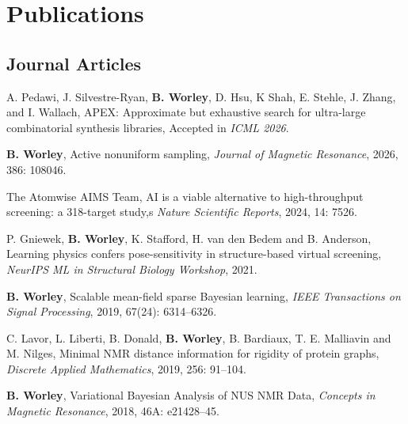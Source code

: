 \documentclass[letterpaper]{article}
\renewenvironment{itemize}{
  \begin{list}{}{
    \setlength{\leftmargin}{1.5em}
  }
}{
  \end{list}
}
\begin{document}
\section*{Publications}

\subsection*{Journal Articles}


\begin{itemize}

 \item A. Pedawi, J. Silvestre-Ryan, \textbf{B. Worley}, D. Hsu,
  K Shah, E. Stehle, J. Zhang, and I. Wallach,
  APEX: Approximate but exhaustive search for ultra-large
  combinatorial synthesis libraries,
  Accepted in \emph{ICML 2026}.

 \item \textbf{B. Worley},
  Active nonuniform sampling,
  \emph{Journal of Magnetic Resonance},
  2026, 386: 108046.

 \item The Atomwise AIMS Team, AI is a viable alternative to
  high-throughput screening: a 318-target study,s
  \emph{Nature Scientific Reports}, 2024, 14: 7526.

 \item P. Gniewek, \textbf{B. Worley}, K. Stafford, H. van den Bedem
  and B. Anderson, Learning physics confers pose-sensitivity in
  structure-based virtual screening,
  \emph{NeurIPS ML in Structural Biology Workshop}, 2021.

 \item \textbf{B. Worley},
  Scalable mean-field sparse Bayesian learning,
  \emph{IEEE Transactions on Signal Processing},
  2019, 67(24): 6314--6326.

 \item C. Lavor, L. Liberti, B. Donald, \textbf{B. Worley},
  B. Bardiaux, T. E. Malliavin and M. Nilges, Minimal NMR distance
  information for rigidity of protein graphs,
  \emph{Discrete Applied Mathematics},
  2019, 256: 91--104.

 \item \textbf{B. Worley},
  Variational Bayesian Analysis of NUS NMR Data,
  \emph{Concepts in Magnetic Resonance},
  2018, 46A: e21428--45.


\end{itemize}
\end{document}
